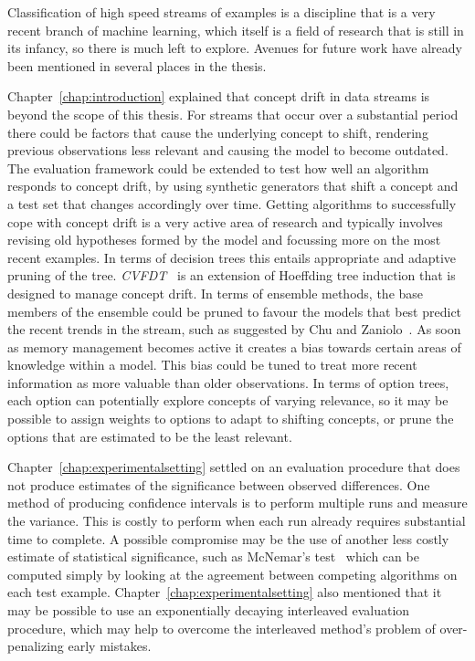 Classification of high speed streams of examples is a discipline that is a very recent branch of machine learning, which itself is a field of research that is still in its infancy, so there is much left to explore. Avenues for future work have already been mentioned in several places in the thesis. 

Chapter~\ref{chap:introduction} explained that concept drift in data streams is beyond the scope of this thesis. For streams that occur over a substantial period there could be factors that cause the underlying concept to shift, rendering previous observations less relevant and causing the model to become outdated. The evaluation framework could be extended to test how well an algorithm responds to concept drift, by using synthetic generators that shift a concept and a test set that changes accordingly over time. Getting algorithms to successfully cope with concept drift is a very active area of research and typically involves revising old hypotheses formed by the model and focussing more on the most recent examples. In terms of decision trees this entails appropriate and adaptive pruning of the tree. {\em CVFDT}~\cite{cvfdt} is an extension of Hoeffding tree induction that is designed to manage concept drift. In terms of ensemble methods, the base members of the ensemble could be pruned to favour the models that best predict the recent trends in the stream, such as suggested by Chu and Zaniolo~\cite{fastlightboost}.  
As soon as memory management becomes active it creates a bias towards certain areas of knowledge within a model. This bias could be tuned to treat more recent information as more valuable than older observations. In terms of option trees, each option can potentially explore concepts of varying relevance, so it may be possible to assign weights to options to adapt to shifting concepts, or prune the options that are estimated to be the least relevant.

Chapter~\ref{chap:experimentalsetting} settled on an evaluation procedure that does not produce estimates of the significance between observed differences. One method of producing confidence intervals is to perform multiple runs and measure the variance. This is costly to perform when each run already requires substantial time to complete. A possible compromise may be the use of another less costly estimate of statistical significance, such as McNemar's test~\cite{mcnemar} which can be computed simply by looking at the agreement between competing algorithms on each test example. Chapter~\ref{chap:experimentalsetting} also mentioned that it may be possible to use an exponentially decaying interleaved evaluation procedure, which may help to overcome the interleaved method's problem of over-penalizing early mistakes.

